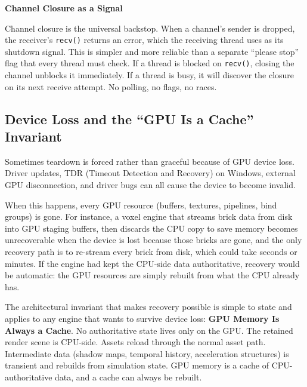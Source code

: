 \documentclass[
  11pt,
  letterpaper,
  DIV=11,
  numbers=noendperiod,
  twoside,
  open=right]{scrreprt}
\begin{document}
\begin{tcolorbox}[enhanced jigsaw, arc=.35mm, bottomrule=.15mm, breakable, colback=white, colframe=quarto-callout-tip-color-frame, left=2mm, leftrule=.75mm, opacityback=0, rightrule=.15mm, toprule=.15mm]
\begin{minipage}[t]{5.5mm}
\textcolor{quarto-callout-tip-color}{\faLightbulb}
\end{minipage}%
\begin{minipage}[t]{\textwidth - 5.5mm}

\vspace{-3mm}\textbf{Channel Closure as a Signal}\vspace{3mm}

Channel closure is the universal backstop. When a channel's sender is
dropped, the receiver's \texttt{recv()} returns an error, which the
receiving thread uses as its shutdown signal. This is simpler and more
reliable than a separate ``please stop'' flag that every thread must
check. If a thread is blocked on \texttt{recv()}, closing the channel
unblocks it immediately. If a thread is busy, it will discover the
closure on its next receive attempt. No polling, no flags, no races.

\end{minipage}%
\end{tcolorbox}

\subsection{Device Loss and the ``GPU Is a Cache''
Invariant}\label{device-loss-and-the-gpu-is-a-cache-invariant}

Sometimes teardown is forced rather than graceful because of GPU device
loss. Driver updates, TDR (Timeout Detection and Recovery) on Windows,
external GPU disconnection, and driver bugs can all cause the device to
become invalid.

When this happens, every GPU resource (buffers, textures, pipelines,
bind groups) is gone. For instance, a voxel engine that streams brick
data from disk into GPU staging buffers, then discards the CPU copy to
save memory becomes unrecoverable when the device is lost because those
bricks are gone, and the only recovery path is to re-stream every brick
from disk, which could take seconds or minutes. If the engine had kept
the CPU-side data authoritative, recovery would be automatic: the GPU
resources are simply rebuilt from what the CPU already has.

The architectural invariant that makes recovery possible is simple to
state and applies to any engine that wants to survive device loss:
\textbf{GPU Memory Is Always a Cache}. No authoritative state lives only
on the GPU. The retained render scene is CPU-side. Assets reload through
the normal asset path. Intermediate data (shadow maps, temporal history,
acceleration structures) is transient and rebuilds from simulation
state. GPU memory is a cache of CPU-authoritative data, and a cache can
always be rebuilt.
\end{document}
